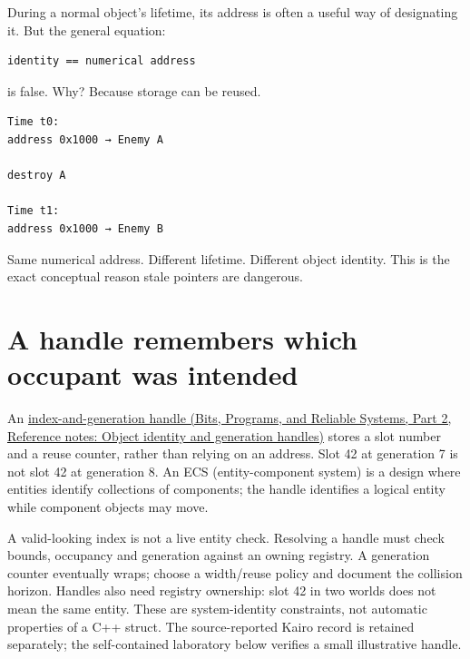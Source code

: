 \hypertarget{05-engine-i-ch002-address-is-often-useful-as-identity-but-is-not-identity-itself}{}

During a normal object's lifetime, its address is often a useful way of designating it. But the general equation:

\begin{verbatim}
identity == numerical address
\end{verbatim}

is false. Why? Because storage can be reused.

\begin{verbatim}
Time t0:
address 0x1000 → Enemy A

destroy A

Time t1:
address 0x1000 → Enemy B
\end{verbatim}

Same numerical address. Different lifetime. Different object identity. This is the exact conceptual reason stale pointers are dangerous.

\section{A handle remembers which occupant was intended}\label{05-engine-i-ch002-a-handle-remembers-which-occupant-was-intended}

\hypertarget{05-engine-i-ch002-a-handle-remembers-which-occupant-was-intended}{}

An \href{../01-Bits-Programs-and-Reliable-Systems-P02/main.pdf\#nameddest=appendix-f1581457d322}{index-and-generation handle (Bits, Programs, and Reliable Systems, Part 2, Reference notes: Object identity and generation handles)} stores a slot number and a reuse counter, rather than relying on an address. Slot 42 at generation 7 is not slot 42 at generation 8. An ECS (entity-component system) is a design where entities identify collections of components; the handle identifies a logical entity while component objects may move.

A valid-looking index is not a live entity check. Resolving a handle must check bounds, occupancy and generation against an owning registry. A generation counter eventually wraps; choose a width/reuse policy and document the collision horizon. Handles also need registry ownership: slot 42 in two worlds does not mean the same entity. These are system-identity constraints, not automatic properties of a C++ struct. The source-reported Kairo record is retained separately; the self-contained laboratory below verifies a small illustrative handle.

